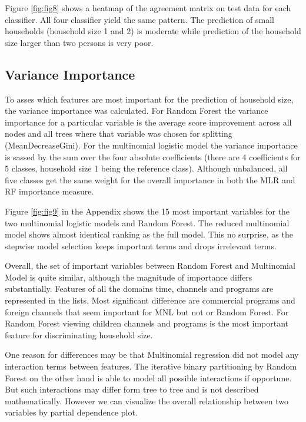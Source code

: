 \documentclass[]{article}
\begin{document}
Figure \ref{fig:fig8} shows a heatmap of the agreement matrix on test
data for each classifier. All four classifier yield the same pattern.
The prediction of small households (household size 1 and 2) is moderate
while prediction of the household size larger than two persons is very
poor.

\hypertarget{variance-importance}{%
\subsection{Variance Importance}\label{variance-importance}}

To asses which features are most important for the prediction of
household size, the variance importance was calculated. For Random
Forest the variance importance for a particular variable is the average
score improvement across all nodes and all trees where that variable was
chosen for splitting (MeanDecreaseGini). For the multinomial logistic
model the variance importance is sassed by the sum over the four
absolute coefficients (there are 4 coefficients for 5 classes, household
size 1 being the reference class). Although unbalanced, all five classes
get the same weight for the overall importance in both the MLR and RF
importance measure.

Figure \ref{fig:fig9} in the Appendix shows the 15 most important
variables for the two multinomial logistic models and Random Forest. The
reduced multinomial model shows almost identical ranking as the full
model. This no surprise, as the stepwise model selection keeps important
terms and drops irrelevant terms.

Overall, the set of important variables between Random Forest and
Multinomial Model is quite similar, although the magnitude of importance
differs substantially. Features of all the domains time, channels and
programs are represented in the lists. Most significant difference are
commercial programs and foreign channels that seem important for MNL but
not or Random Forest. For Random Forest viewing children channels and
programs is the most important feature for discriminating household
size.

One reason for differences may be that Multinomial regression did not
model any interaction terms between features. The iterative binary
partitioning by Random Forest on the other hand is able to model all
possible interactions if opportune. But such interactions may differ
form tree to tree and is not described mathematically. However we can
visualize the overall relationship between two variables by partial
dependence plot.
\end{document}
